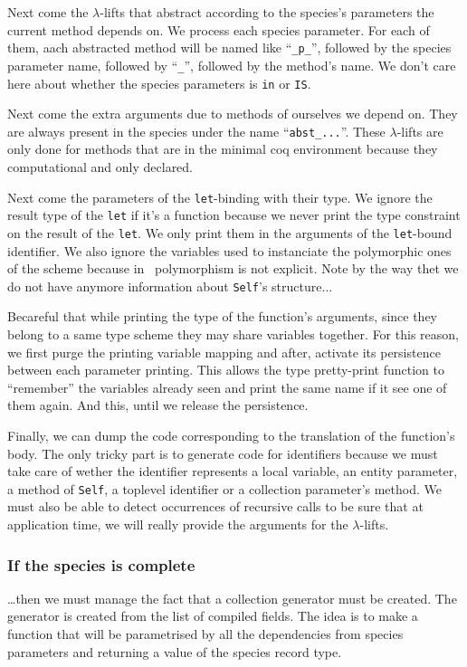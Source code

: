 \medskip
Next come the $\lambda$-lifts that abstract according to the species's
parameters the current method depends on. We process each species
parameter. For each of them, aach abstracted method will be named like
``{\tt \_p\_}'', followed by the species parameter name, followed by
``{\tt \_}'', followed by the method's name. We don't care here about
whether the species parameters is {\tt in} or {\tt IS}.

\medskip
Next come the extra arguments due to methods of ourselves we depend
on. They are always present in the species under the name
``{\tt abst\_...}''. These $\lambda$-lifts are only done for methods
that are in the minimal coq environment because they computational and
only declared.

\medskip
Next come the parameters of the {\tt let}-binding with their type. We
ignore the result type of the {\tt let} if it's a function because we
never print the type constraint on the result of the {\tt let}. We
only print them in the arguments of the {\tt let}-bound identifier.
We also ignore the variables used to instanciate the polymorphic ones
of the scheme because in \ocaml\ polymorphism is not explicit.   
Note by the way thet we do not have anymore information about
{\tt Self}'s structure...

Becareful that while printing the type of the function's arguments,
since they belong to a same type scheme they may share variables
together. For this reason, we first purge the printing variable
mapping and after, activate its persistence between each parameter
printing. This allows the type pretty-print function to ``remember''
the variables already seen and print the same name if it see one of
them again. And this, until we release the persistence.

\medskip
Finally, we can dump the code corresponding to the translation of the
function's body. The only tricky part is to generate code for
identifiers because we must take care of wether the identifier
represents a local variable, an entity parameter, a method of
{\tt Self}, a toplevel identifier or a collection parameter's method.
We must also be able to detect occurrences of recursive calls to be
sure that at application time, we will really provide the arguments
for the $\lambda$-lifts.

\subsubsection{If the species is complete}
\ldots then we must manage the fact that a collection generator must
be created. The generator is created from the list of compiled fields.
The idea is to make a function that will be parametrised by all the
dependencies from species parameters and returning a value of the
species record type.

